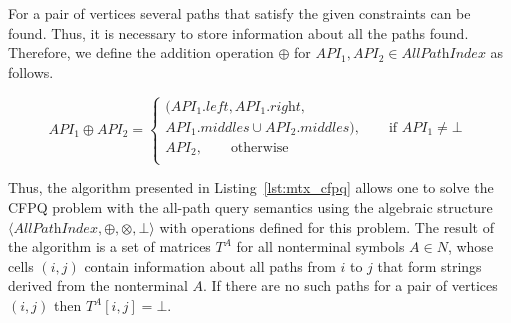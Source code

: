 For a pair of vertices several paths that satisfy the given constraints can be found. Thus, it is necessary to store information about all the paths found. Therefore, we define the addition operation $\oplus$ for \mbox{$\textit{API}_1, \textit{API}_2 \in \textit{AllPathIndex}$} as follows.

$$\textit{API}_1 \oplus \textit{API}_2 = \begin{cases}
      (\textit{API}_1.\textit{left}, \textit{API}_1.\textit{right}, \\ \textit{API}_1.\textit{middles} \cup \textit{API}_2.\textit{middles}), \qquad \text{if $\textit{API}_1\neq \bot$} \\
      \textit{API}_2, \qquad \text{otherwise} \\
    \end{cases}\
$$

Thus, the algorithm presented in Listing~\ref{lst:mtx_cfpq} allows one to solve the CFPQ problem with the all-path query semantics using the algebraic structure $\langle \textit{AllPathIndex}, \oplus, \otimes, \bot \rangle$ with operations defined for this problem. The result of the algorithm is a set of matrices $T^A$ for all nonterminal symbols $A \in N$, whose cells $(i, j)$ contain information about all paths from $i$ to $j$ that form strings derived from the nonterminal $A$. If there are no such paths for a pair of vertices $(i, j)$ then $T^A[i, j] = \bot$.

